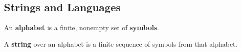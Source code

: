 





\subsection{Strings and Languages}

\begin{definition} An \textbf{alphabet} is a finite, nonempty set of
\textbf{symbols}.  \end{definition}

\begin{definition} A \textbf{string} over an alphabet is a finite sequence of
symbols from that alphabet. \end{definition}

